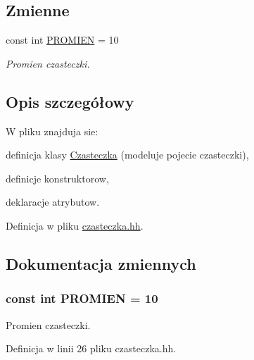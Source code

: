 \subsection*{Zmienne}
\begin{DoxyCompactItemize}
\item 
const int \hyperlink{czasteczka_8hh_aa77f856f3142a9e81752665a9bc2e6de}{P\-R\-O\-M\-I\-E\-N} = 10
\begin{DoxyCompactList}\small\item\em Promien czasteczki. \end{DoxyCompactList}\end{DoxyCompactItemize}


\subsection{Opis szczegółowy}
W pliku znajduja sie\-:
\begin{DoxyItemize}
\item definicja klasy \hyperlink{class_czasteczka}{Czasteczka} (modeluje pojecie czasteczki),
\item definicje konstruktorow,
\item deklaracje atrybutow. 
\end{DoxyItemize}

Definicja w pliku \hyperlink{czasteczka_8hh_source}{czasteczka.\-hh}.



\subsection{Dokumentacja zmiennych}
\hypertarget{czasteczka_8hh_aa77f856f3142a9e81752665a9bc2e6de}{
\subsubsection[{P\-R\-O\-M\-I\-E\-N}]{\setlength{\rightskip}{0pt plus 5cm}const int P\-R\-O\-M\-I\-E\-N = 10}}\label{czasteczka_8hh_aa77f856f3142a9e81752665a9bc2e6de}
Promien czasteczki. 

Definicja w linii 26 pliku czasteczka.\-hh.

